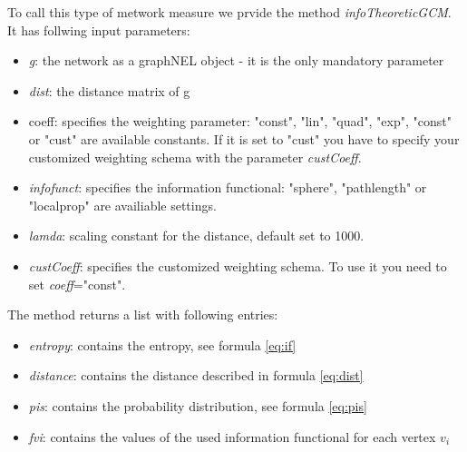 \documentclass[a4paper]{article}
\begin{document}
To call this type of metwork measure we prvide the method \textit{infoTheoreticGCM}. 
It has follwing input parameters:
\begin{itemize}
\item \textit{g}: the network as a graphNEL object - it is the only mandatory parameter
\item \textit{dist}: the distance matrix of g
\item \textup{coeff}: specifies the weighting parameter: "const", "lin", "quad", "exp", "const" or "cust" are available constants. If it is set to
    "cust" you have to specify your customized weighting schema with the parameter \textit{custCoeff}.
\item \textit{infofunct}: specifies the information functional: "sphere", "pathlength" or "localprop" are availiable settings.
\item \textit{lamda}: scaling constant for the distance, default set to 1000.
\item \textit{custCoeff}: specifies the customized weighting schema. To use it you need to set \textit{coeff}="const".
\end{itemize}

The method returns a list with following entries:
\begin{itemize}
\item \textit{entropy}: contains the entropy, see formula \ref{eq:if} 
\item \textit{distance}: contains the distance described in formula \ref{eq:dist}
\item \textit{pis}: contains the probability distribution, see formula \ref{eq:pis}
\item \textit{fvi}: contains the values of the used information functional for each vertex $v_i$
\end{itemize}
\end{document}
